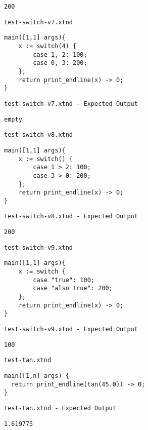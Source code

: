 \begin{lstlisting}
200
\end{lstlisting}


\medskip \noindent \texttt{test-switch-v7.xtnd}


\begin{lstlisting}
main([1,1] args){
	x := switch(4) {
		case 1, 2: 100;
		case 0, 3: 200;
	};
	return print_endline(x) -> 0;
}
\end{lstlisting}


\medskip \noindent \texttt{test-switch-v7.xtnd - Expected Output}


\begin{lstlisting}
empty
\end{lstlisting}


\medskip \noindent \texttt{test-switch-v8.xtnd}


\begin{lstlisting}
main([1,1] args){
	x := switch() {
		case 1 > 2: 100;
		case 3 > 0: 200;
	};
	return print_endline(x) -> 0;
}
\end{lstlisting}


\medskip \noindent \texttt{test-switch-v8.xtnd - Expected Output}


\begin{lstlisting}
200
\end{lstlisting}


\medskip \noindent \texttt{test-switch-v9.xtnd}


\begin{lstlisting}
main([1,1] args){
	x := switch {
		case "true": 100;
		case "also true": 200;
	};
	return print_endline(x) -> 0;
}
\end{lstlisting}


\medskip \noindent \texttt{test-switch-v9.xtnd - Expected Output}


\begin{lstlisting}
100
\end{lstlisting}


\medskip \noindent \texttt{test-tan.xtnd}


\begin{lstlisting}
main([1,n] args) {
  return print_endline(tan(45.0)) -> 0;
}
\end{lstlisting}


\medskip \noindent \texttt{test-tan.xtnd - Expected Output}


\begin{lstlisting}
1.619775
\end{lstlisting}


